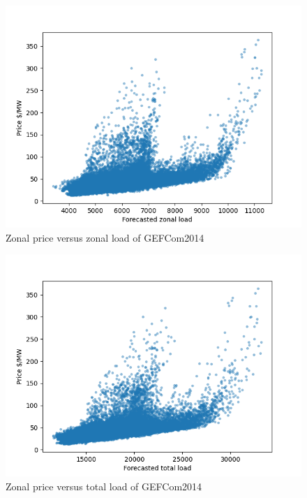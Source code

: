 \begin{figure}[!h]
    \includegraphics[width=\textwidth]{images/gefcom_zonal_price_vs_zonal_load.png}
    \caption{Zonal price versus zonal load of GEFCom2014}
    \label{fig:gefcom_zonal_price_vs_zonal_load}
\end{figure}


\begin{figure}[!h]
    \includegraphics[width=\textwidth]{images/gefcom_zonal_price_vs_total_load.png}
    \caption{Zonal price versus total load of GEFCom2014}
    \label{fig:gefcom_zonal_price_vs_total_load}
\end{figure}

